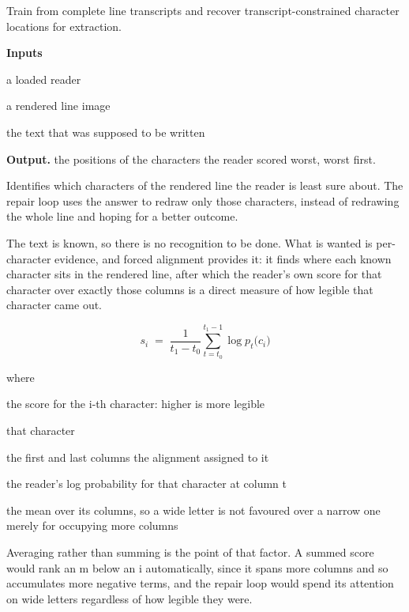 Train from complete line transcripts and recover transcript-constrained character locations for extraction.




\noindent\textbf{Inputs}
\begin{description}[leftmargin=2.2em,style=nextline,font=\normalfont\ttfamily]\setlength\itemsep{1pt}
  \item[{reader}] \normalfont a loaded reader
  \item[{img}] \normalfont a rendered line image
  \item[{visible}] \normalfont the text that was supposed to be written
\end{description}

\noindent\textbf{Output.} the positions of the characters the reader scored worst, worst first.


Identifies which characters of the rendered line the reader is least sure about. The repair loop uses the answer to redraw only those characters, instead of redrawing the whole line and hoping for a better outcome.


The text is known, so there is no recognition to be done. What is wanted is per-character evidence, and forced alignment provides it: it finds where each known character sits in the rendered line, after which the reader's own score for that character over exactly those columns is a direct measure of how legible that character came out.


\begin{equation}
s_i \;=\; \frac{1}{t_1 - t_0} \sum_{t=t_0}^{t_1-1} \log p_t\big(c_i\big)
\end{equation}

\noindent where
\begin{description}[leftmargin=2.4em,style=nextline,font=\normalfont\ttfamily]\setlength\itemsep{1pt}
  \item[{$s_i$}] \normalfont the score for the i-th character: higher is more legible
  \item[{$c_i$}] \normalfont that character
  \item[{$t_0,\, t_1$}] \normalfont the first and last columns the alignment assigned to it
  \item[{$\log p_t(c_i)$}] \normalfont the reader's log probability for that character at column t
  \item[{$\frac{1}{t_1-t_0}$}] \normalfont the mean over its columns, so a wide letter is not favoured over a narrow one merely for occupying more columns
\end{description}
Averaging rather than summing is the point of that factor. A summed score would rank an m below an i automatically, since it spans more columns and so accumulates more negative terms, and the repair loop would spend its attention on wide letters regardless of how legible they were.


